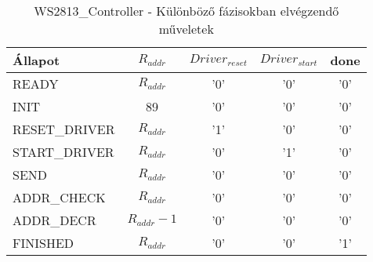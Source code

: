 \begin{table}[!htb]
	\begin{center}
		\caption{WS2813\_Controller - Különböző fázisokban elvégzendő műveletek}
		\begin{tabular}{l|c|c|c|c}
		\textbf{Állapot} & $R_{addr}$ 	  & $Driver_{reset}$     & $Driver_{start}$      & done \\
		\hline         
        READY            & $R_{addr}$ 	  & '0'                  & '0'                   & '0'  \\
        \hline         
        INIT             & 89       	  & '0'                  & '0'                   & '0'  \\
        \hline         
        RESET\_DRIVER    & $R_{addr}$  	  & '1'                  & '0'                   & '0'  \\
        \hline         
        START\_DRIVER    & $R_{addr}$  	  & '0'                  & '1'                   & '0'  \\
        \hline         
        SEND             & $R_{addr}$  	  & '0'                  & '0'                   & '0'  \\
        \hline         
		ADDR\_CHECK      & $R_{addr}$     & '0'                  & '0'                   & '0'  \\
        \hline         
        ADDR\_DECR       & $R_{addr} - 1$ & '0'                  & '0'                   & '0'  \\
        \hline         
        FINISHED         & $R_{addr}$     & '0'                  & '0'                   & '1'  \\
		\end{tabular}
	\end{center}
\end{table}